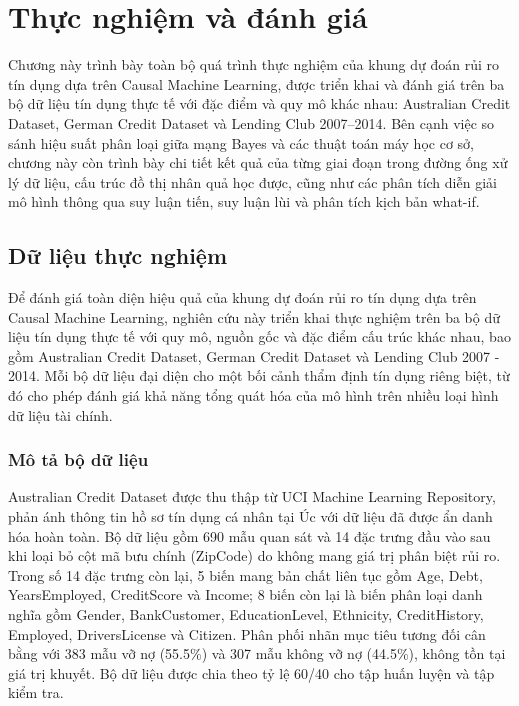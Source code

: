 \newpage
\section{Thực nghiệm và đánh giá}
\noindent
Chương này trình bày toàn bộ quá trình thực nghiệm của khung dự đoán rủi ro tín dụng dựa trên Causal Machine Learning, được triển khai và đánh giá trên ba bộ dữ liệu tín dụng thực tế với đặc điểm và quy mô khác nhau: Australian Credit Dataset, German Credit Dataset và Lending Club 2007–2014. Bên cạnh việc so sánh hiệu suất phân loại giữa mạng Bayes và các thuật toán máy học cơ sở, chương này còn trình bày chi tiết kết quả của từng giai đoạn trong đường ống xử lý dữ liệu, cấu trúc đồ thị nhân quả học được, cũng như các phân tích diễn giải mô hình thông qua suy luận tiến, suy luận lùi và phân tích kịch bản what-if.

\subsection{Dữ liệu thực nghiệm}
\noindent
Để đánh giá toàn diện hiệu quả của khung dự đoán rủi ro tín dụng dựa trên Causal Machine Learning, nghiên cứu này triển khai thực nghiệm trên ba bộ dữ liệu tín dụng thực tế với quy mô, nguồn gốc và đặc điểm cấu trúc khác nhau, bao gồm Australian Credit Dataset, German Credit Dataset và Lending Club 2007 - 2014. Mỗi bộ dữ liệu đại diện cho một bối cảnh thẩm định tín dụng riêng biệt, từ đó cho phép đánh giá khả năng tổng quát hóa của mô hình trên nhiều loại hình dữ liệu tài chính.

\subsubsection{Mô tả bộ dữ liệu}
Australian Credit Dataset được thu thập từ UCI Machine Learning Repository, phản ánh thông tin hồ sơ tín dụng cá nhân tại Úc với dữ liệu đã được ẩn danh hóa hoàn toàn. Bộ dữ liệu gồm 690 mẫu quan sát và 14 đặc trưng đầu vào sau khi loại bỏ cột mã bưu chính (ZipCode) do không mang giá trị phân biệt rủi ro. Trong số 14 đặc trưng còn lại, 5 biến mang bản chất liên tục gồm Age, Debt, YearsEmployed, CreditScore và Income; 8 biến còn lại là biến phân loại danh nghĩa gồm Gender, BankCustomer, EducationLevel, Ethnicity, CreditHistory, Employed, DriversLicense và Citizen. Phân phối nhãn mục tiêu tương đối cân bằng với 383 mẫu vỡ nợ (55.5\%) và 307 mẫu không vỡ nợ (44.5\%), không tồn tại giá trị khuyết. Bộ dữ liệu được chia theo tỷ lệ 60/40 cho tập huấn luyện và tập kiểm tra.

